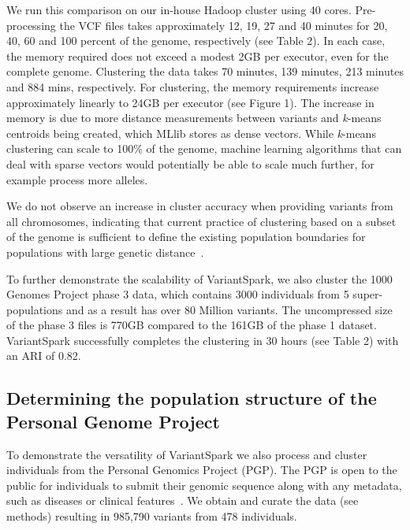 \documentclass{bmcart}
\newcommand{\variantSpark}{{\sc VariantSpark}}
\newcommand{\kMeans}{\textit{k}-means}
\begin{document}
We run this comparison on our in-house Hadoop cluster using 40 cores.
Pre-processing the VCF files takes approximately 12, 19, 27 and 40 minutes for 20, 40, 60 and 100 percent of the genome, respectively (see Table 2).
In each case, the memory required does not exceed a modest 2GB per executor, even for the complete genome. 
Clustering the data takes 70 minutes, 139 minutes, 213 minutes and 884 mins, respectively.
For clustering, the memory requirements increase approximately linearly to 24GB per executor (see Figure 1). 
The increase in memory is due to more distance measurements between variants and \kMeans{} centroids being created, which MLlib stores as dense vectors. 
While \kMeans{} clustering can scale to 100\% of the genome, machine learning algorithms that can deal with sparse vectors would potentially be able to scale much further, for example process more alleles.

We do not observe an increase in cluster accuracy when providing variants from all chromosomes, indicating that current practice of clustering based on a subset of the genome is sufficient to define the existing population boundaries for populations with large genetic distance~\cite{Pugach2015}.

To further demonstrate the scalability of \variantSpark{}, we also cluster the 1000 Genomes Project phase 3 data, which contains 3000 individuals from 5 super-populations and as a result has over 80 Million variants. 
The uncompressed size of the phase 3 files is 770GB compared to the 161GB of the phase 1 dataset.
\variantSpark{} successfully completes the clustering in 30 hours (see Table 2) with an ARI of 0.82. 



\subsection*{Determining the population structure of the Personal Genome Project}
To demonstrate the versatility of \variantSpark{} we also process and cluster individuals from the Personal Genomics Project (PGP). The PGP is open to the public for individuals to submit their genomic sequence along with any metadata, such as diseases or clinical features~\cite{Lunshof2013}. 
We obtain and curate the data (see methods) resulting in 985,790 variants from 478 individuals.
\end{document}
